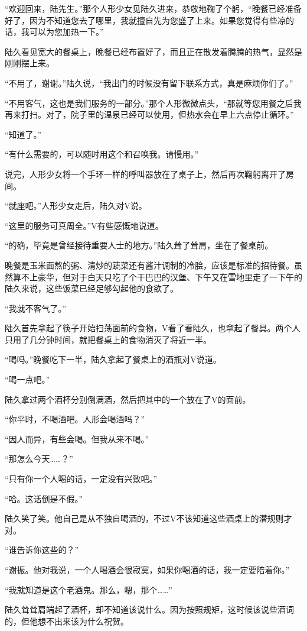 “欢迎回来，陆先生。”那个人形少女见陆久进来，恭敬地鞠了个躬，“晚餐已经准备好了，因为不知道您去了哪里，我就擅自先为您盛了上来。如果您觉得有些凉的话，我可以为您加热一下。”

陆久看见宽大的餐桌上，晚餐已经布置好了，而且正在散发着腾腾的热气，显然是刚刚摆上来。

“不用了，谢谢。”陆久说，“我出门的时候没有留下联系方式，真是麻烦你们了。”

“不用客气，这也是我们服务的一部分。”那个人形微微点头，“那就等您用餐之后我再来打扫。对了，院子里的温泉已经可以使用，但热水会在早上六点停止循环。”

“知道了。”

“有什么需要的，可以随时用这个和召唤我。请慢用。”

说完，人形少女将一个手环一样的呼叫器放在了桌子上，然后再次鞠躬离开了房间。

“就座吧。”人形少女走后，陆久对V说。

“这里的服务可真周全。”V有些感慨地说道。

“的确，毕竟是曾经接待重要人士的地方。”陆久耸了耸肩，坐在了餐桌前。

晚餐是玉米面熬的粥、清炒的蔬菜还有酱汁调制的冷脍，应该是标准的招待餐。虽然算不上豪华，但对于白天只吃了个干巴巴的汉堡、下午又在雪地里走了一下午的陆久来说，这些饭菜已经足够勾起他的食欲了。

“我就不客气了。”

陆久首先拿起了筷子开始扫荡面前的食物，V看了看陆久，也拿起了餐具。两个人只用了几分钟时间，就把餐桌上的食物消灭了将近一半。

“喝吗。”晚餐吃下一半，陆久拿起了餐桌上的酒瓶对V说道。

“喝一点吧。”

陆久拿过两个酒杯分别倒满酒，然后把其中的一个放在了V的面前。

“你平时，不喝酒吧。人形会喝酒吗？”

“因人而异，有些会喝。但我从来不喝。”

“那怎么今天……？”

“只有你一个人喝的话，一定没有兴致吧。”

“哈。这话倒是不假。”

陆久笑了笑。他自己是从不独自喝酒的，不过V不该知道这些酒桌上的潜规则才对。

“谁告诉你这些的？”

“谢振。他对我说，一个人喝酒会很寂寞，如果你喝酒的话，我一定要陪着你。”

“我就知道是这个老酒鬼。那么，嗯，那个……”

陆久耸耸肩端起了酒杯，却不知道该说什么。因为按照规矩，这时候该说些酒词的，但他想不出来该为什么祝贺。

